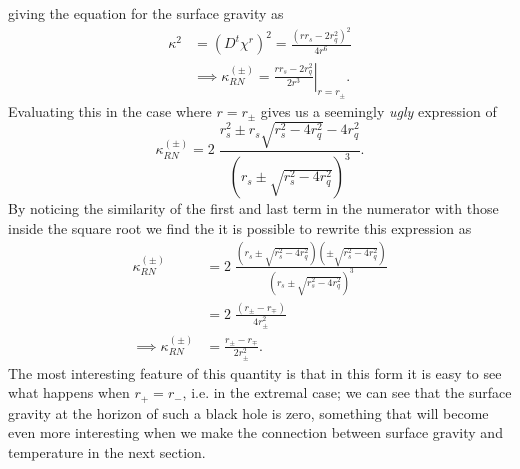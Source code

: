 \documentclass[12pt]{article}
\numberwithin{equation}{section}
\numberwithin{figure}{section}
\begin{document}
giving the equation for the surface gravity as 
\begin{align}
	\kappa^2&=(D^t\chi^r)^2=\frac{(rr_s-2r_q^2)^2}{4r^6}\\
	&\implies \kappa_{RN}^{(\pm)}=\left. \frac{rr_s-2r_q^2}{2r^3}\right|_{r=r_\pm}.
\end{align}
Evaluating this in the case where $r=r_\pm$ gives us a seemingly \emph{ugly} expression of
\begin{equation}
	\kappa_{RN}^{(\pm)}=2 \;\frac{r_s^2\pm r_s\sqrt{r_s^2-4r_q^2}-4r_q^2}{\left(r_s\pm\sqrt{r_s^2-4r_q^2}\right)^3}.
\end{equation}
By noticing the similarity of the first and last term in the numerator with those inside the square root we find the it is possible to rewrite this expression as
\begin{align}
	\kappa_{RN}^{(\pm)}&=2 \;\frac{\left(r_s\pm\sqrt{r_s^2-4r_q^2}\right)\left(\pm\sqrt{r_s^2-4r_q^2}\right)}{\left(r_s\pm\sqrt{r_s^2-4r_q^2}\right)^3}\\
	&=2\;\frac{(r_\pm-r_\mp)}{4r_\pm^2}\\
	\implies \kappa_{RN}^{(\pm)}&=\frac{r_\pm - r_\mp}{2r_\pm^2}.
\end{align}
The most interesting feature of this quantity is that in this form it is easy to see what happens when $r_+=r_-$, i.e. in the extremal case; we can see that the surface gravity at the horizon of such a black hole is zero, something that will become even more interesting when we make the connection between surface gravity and temperature in the next section.
\end{document}
